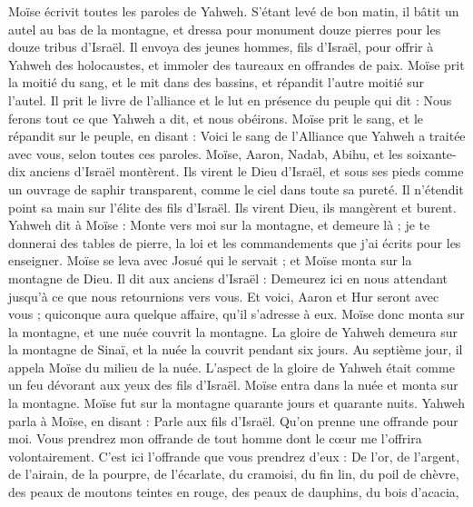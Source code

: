 \begin{multicols}{2}
Moïse écrivit toutes les paroles de Yahweh. S'étant levé de bon matin, il bâtit un autel au bas de la montagne, et dressa pour monument douze pierres pour les douze tribus d'Israël.
Il envoya des jeunes hommes, fils d'Israël, pour offrir à Yahweh des holocaustes, et immoler des taureaux en offrandes de paix.
Moïse prit la moitié du sang, et le mit dans des bassins, et répandit l'autre moitié sur l'autel.
Il prit le livre de l'alliance et le lut en présence du peuple qui dit : Nous ferons tout ce que Yahweh a dit, et nous obéirons.
Moïse prit le sang, et le répandit sur le peuple, en disant : Voici le sang de l'Alliance que Yahweh a traitée avec vous, selon toutes ces paroles.
Moïse, Aaron, Nadab, Abihu, et les soixante-dix anciens d'Israël montèrent.
Ils virent le Dieu d'Israël, et sous ses pieds comme un ouvrage de saphir transparent, comme le ciel dans toute sa pureté.
Il n’étendit point sa main sur l’élite des fils d'Israël. Ils virent Dieu, ils mangèrent et burent.
Yahweh dit à Moïse : Monte vers moi sur la montagne, et demeure là ; je te donnerai des tables de pierre, la loi et les commandements que j'ai écrits pour les enseigner.
Moïse se leva avec Josué qui le servait ; et Moïse monta sur la montagne de Dieu.
Il dit aux anciens d'Israël : Demeurez ici en nous attendant jusqu'à ce que nous retournions vers vous. Et voici, Aaron et Hur seront avec vous ; quiconque aura quelque affaire, qu'il s'adresse à eux.
Moïse donc monta sur la montagne, et une nuée couvrit la montagne.
La gloire de Yahweh demeura sur la montagne de Sinaï, et la nuée la couvrit pendant six jours. Au septième jour, il appela Moïse du milieu de la nuée.
L’aspect de la gloire de Yahweh était comme un feu dévorant aux yeux des fils d'Israël.
Moïse entra dans la nuée et monta sur la montagne. Moïse fut sur la montagne quarante jours et quarante nuits.
\VerseOne{}Yahweh parla à Moïse, en disant :
Parle aux fils d'Israël. Qu'on prenne une offrande pour moi. Vous prendrez mon offrande de tout homme dont le cœur me l'offrira volontairement.
C'est ici l'offrande que vous prendrez d'eux : De l'or, de l'argent, de l'airain,
de la pourpre, de l'écarlate, du cramoisi, du fin lin, du poil de chèvre,
des peaux de moutons teintes en rouge, des peaux de dauphins, du bois d’acacia,

\end{multicols}
